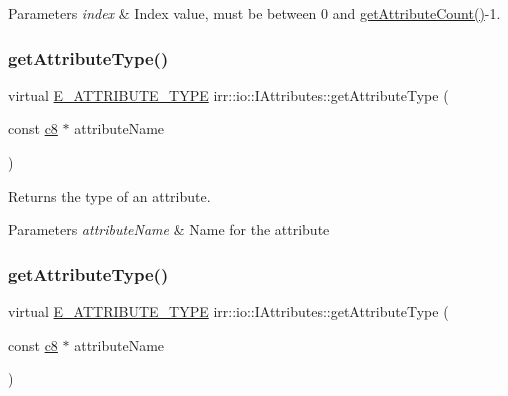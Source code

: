 \begin{DoxyParams}{Parameters}
{\em index} & Index value, must be between 0 and \hyperlink{classirr_1_1io_1_1IAttributes_a796bdd9440ee7ba0b6742a90a82870b6}{get\+Attribute\+Count()}-\/1. \\
\hline
\end{DoxyParams}
\mbox{\label{classirr_1_1io_1_1IAttributes_af14805d54f8cfae0a76751d13931390a}} 
\subsubsection{\texorpdfstring{get\+Attribute\+Type()}{getAttributeType()}\hspace{0.1cm}{\footnotesize\ttfamily [1/4]}}
{\footnotesize\ttfamily virtual \hyperlink{namespaceirr_1_1io_a874a5f14dbe2e45c40c2bb29e9f0ebcb}{E\+\_\+\+A\+T\+T\+R\+I\+B\+U\+T\+E\+\_\+\+T\+Y\+PE} irr\+::io\+::\+I\+Attributes\+::get\+Attribute\+Type (\begin{DoxyParamCaption}\item[{const \hyperlink{namespaceirr_a9395eaea339bcb546b319e9c96bf7410}{c8} $\ast$}]{attribute\+Name }\end{DoxyParamCaption})\hspace{0.3cm}{\ttfamily [pure virtual]}}



Returns the type of an attribute. 


\begin{DoxyParams}{Parameters}
{\em attribute\+Name} & Name for the attribute \\
\hline
\end{DoxyParams}
\mbox{\label{classirr_1_1io_1_1IAttributes_af14805d54f8cfae0a76751d13931390a}} 
\subsubsection{\texorpdfstring{get\+Attribute\+Type()}{getAttributeType()}\hspace{0.1cm}{\footnotesize\ttfamily [2/4]}}
{\footnotesize\ttfamily virtual \hyperlink{namespaceirr_1_1io_a874a5f14dbe2e45c40c2bb29e9f0ebcb}{E\+\_\+\+A\+T\+T\+R\+I\+B\+U\+T\+E\+\_\+\+T\+Y\+PE} irr\+::io\+::\+I\+Attributes\+::get\+Attribute\+Type (\begin{DoxyParamCaption}\item[{const \hyperlink{namespaceirr_a9395eaea339bcb546b319e9c96bf7410}{c8} $\ast$}]{attribute\+Name }\end{DoxyParamCaption})\hspace{0.3cm}{\ttfamily [pure virtual]}}



